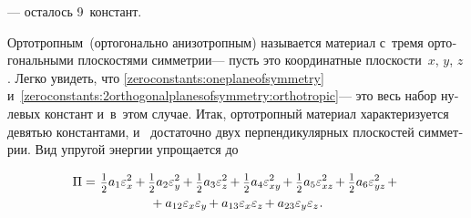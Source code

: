 \begin{otherlanguage}{russian}
\vspace{-0.25em}\noindent
--- осталось 9~констант.

Ортотропным~(ортогонально анизотропным) называется материал с~тремя ортогональными плоскостями симметрии\:--- пусть это координатные плоскости~$x$, $y$, $z$.
Легко увидеть, что \eqref{zeroconstants:oneplaneofsymmetry} и~\eqref{zeroconstants:2orthogonalplanesofsymmetry:orthotropic}\:--- это весь набор нулевых констант и~в~этом случае.
Итак, ортотропный материал характеризуется девятью константами, и~ достаточно двух перпендикулярных плоскостей симметрии.
Вид упругой энергии упрощается до

\nopagebreak\vspace{-0.25em}\begin{multline*}
\potential =^{\mathstrut^{\mathstrut}} \smalldisplaystyleonehalf a_1 \varepsilon^2_{x} \hspace{-0.1ex} + \smalldisplaystyleonehalf a_2 \varepsilon^2_{y} \hspace{-0.1ex} + \smalldisplaystyleonehalf a_3 \varepsilon^2_{z} \hspace{-0.1ex} + \smalldisplaystyleonehalf a_4 \varepsilon^2_{xy} \hspace{-0.2ex} + \smalldisplaystyleonehalf a_5 \varepsilon^2_{xz} \hspace{-0.2ex} + \smalldisplaystyleonehalf a_6 \varepsilon^2_{yz} \hspace{-0.2ex} +{}
\\[-0.1em]
%
{}+ a_{12} \varepsilon_{x} \varepsilon_{y} \hspace{-0.2ex} + a_{13} \varepsilon_{x} \varepsilon_{z} \hspace{-0.2ex} + a_{23} \varepsilon_{y} \varepsilon_{z}
\hspace{.1ex} .
\end{multline*}


\end{otherlanguage}
